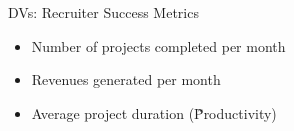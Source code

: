 \begin{frame}{{\color{violet}DVs: Recruiter Success Metrics}}

  \begin{itemize}
    \item Number of projects completed per month
    \item Revenues generated per month
    \item Average project duration (\~Productivity)
  \end{itemize}

    

\end{frame}